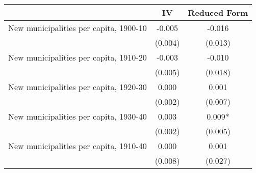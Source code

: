  \begin{tabular}{l*{2}{c}} \toprule
                &\multicolumn{1}{c}{IV}&\multicolumn{1}{c}{Reduced Form}\\
\midrule
New municipalities per capita, 1900-10&   -0.005   &   -0.016   \\
                &  (0.004)   &  (0.013)   \\
\addlinespace
New municipalities per capita, 1910-20&   -0.003   &   -0.010   \\
                &  (0.005)   &  (0.018)   \\
\addlinespace
New municipalities per capita, 1920-30&    0.000   &    0.001   \\
                &  (0.002)   &  (0.007)   \\
\addlinespace
New municipalities per capita, 1930-40&    0.003   &    0.009*  \\
                &  (0.002)   &  (0.005)   \\
\addlinespace
New municipalities per capita, 1910-40&    0.000   &    0.001   \\
                &  (0.008)   &  (0.027)   \\
       \bottomrule \end{tabular}
